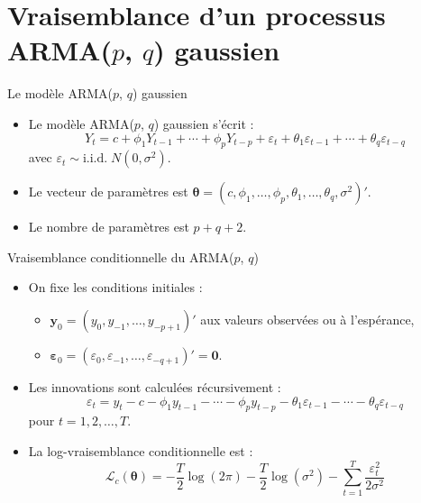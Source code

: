 \documentclass[11pt,aspectratio=169]{beamer}
\begin{document}
\section{Vraisemblance d'un processus ARMA($p$, $q$) gaussien}

\begin{frame}{Le modèle ARMA($p$, $q$) gaussien}

\begin{itemize}

\item Le modèle ARMA($p$, $q$) gaussien s'écrit :
  \[
  Y_t = c + \phi_1 Y_{t-1} + \cdots + \phi_p Y_{t-p} + \varepsilon_t + \theta_1 \varepsilon_{t-1} + \cdots + \theta_q \varepsilon_{t-q}
  \]
  avec $\varepsilon_t \sim \text{i.i.d.}\; N(0, \sigma^2)$.\newline

\item Le vecteur de paramètres est $\bm{\theta} = (c, \phi_1, \ldots, \phi_p, \theta_1, \ldots, \theta_q, \sigma^2)'$.\newline

\item Le nombre de paramètres est $p + q + 2$.

\end{itemize}

\end{frame}

\begin{frame}{Vraisemblance conditionnelle du ARMA($p$, $q$)}

\begin{itemize}

\item On fixe les conditions initiales :
  \begin{itemize}
  \item $\mathbf{y}_0 = (y_0, y_{-1}, \ldots, y_{-p+1})'$ aux valeurs observées ou à l'espérance,
  \item $\bm{\varepsilon}_0 = (\varepsilon_0, \varepsilon_{-1}, \ldots, \varepsilon_{-q+1})' = \mathbf{0}$.
  \end{itemize}

\item Les innovations sont calculées récursivement :
  \[
  \varepsilon_t = y_t - c - \phi_1 y_{t-1} - \cdots - \phi_p y_{t-p} - \theta_1 \varepsilon_{t-1} - \cdots - \theta_q \varepsilon_{t-q}
  \]
  pour $t = 1, 2, \ldots, T$.\newline

\item La log-vraisemblance conditionnelle est :
  \[
  \mathcal{L}_c(\bm{\theta}) = -\frac{T}{2}\log(2\pi) - \frac{T}{2}\log(\sigma^2) - \sum_{t=1}^{T} \frac{\varepsilon_t^2}{2\sigma^2}
  \]

\end{itemize}

\end{frame}
\end{document}
